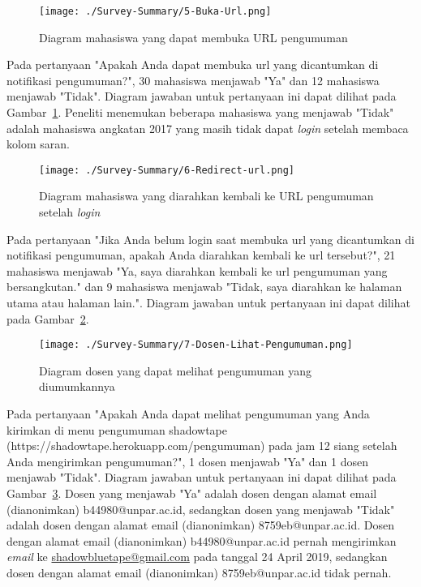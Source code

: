 \begin{figure}[H]
	\centering  
	\texttt{[image: ./Survey-Summary/5-Buka-Url.png]}
	\caption[Diagram mahasiswa yang dapat membuka URL pengumuman]{Diagram mahasiswa yang dapat membuka URL pengumuman} 
	\label{fig:summary-5-Buka-Url} 
\end{figure}
Pada pertanyaan "Apakah Anda dapat membuka url yang dicantumkan di notifikasi pengumuman?", 30 mahasiswa menjawab "Ya" dan 12 mahasiswa menjawab "Tidak". Diagram jawaban untuk pertanyaan ini dapat dilihat pada Gambar~\ref{fig:summary-5-Buka-Url}. Peneliti menemukan beberapa mahasiswa yang menjawab "Tidak" adalah mahasiswa angkatan 2017 yang masih tidak dapat \textit{login} setelah membaca kolom saran.

\begin{figure}[H]
	\centering  
	\texttt{[image: ./Survey-Summary/6-Redirect-url.png]}
	\caption[Diagram mahasiswa yang diarahkan kembali ke URL pengumuman setelah \textit{login}]{Diagram mahasiswa yang diarahkan kembali ke URL pengumuman setelah \textit{login}} 
	\label{fig:summary-6-Redirect-url} 
\end{figure}

Pada pertanyaan "Jika Anda belum login saat membuka url yang dicantumkan di notifikasi pengumuman, apakah Anda diarahkan kembali ke url tersebut?", 21 mahasiswa menjawab "Ya, saya diarahkan kembali ke url pengumuman yang bersangkutan." dan 9 mahasiswa menjawab "Tidak,  saya diarahkan ke halaman utama atau halaman lain.". Diagram jawaban untuk pertanyaan ini dapat dilihat pada Gambar~\ref{fig:summary-6-Redirect-url}.

\begin{figure}[H]
	\centering  
	\texttt{[image: ./Survey-Summary/7-Dosen-Lihat-Pengumuman.png]}
	\caption[Diagram dosen yang dapat melihat pengumuman yang diumumkannya]{Diagram dosen yang dapat melihat pengumuman yang diumumkannya} 
	\label{fig:summary-7-Dosen-Lihat-Pengumuman} 
\end{figure}

Pada pertanyaan "Apakah Anda dapat melihat pengumuman yang Anda kirimkan di menu pengumuman shadowtape (https://shadowtape.herokuapp.com/pengumuman) pada jam 12 siang setelah Anda mengirimkan pengumuman?", 1 dosen menjawab "Ya" dan 1 dosen menjawab "Tidak". Diagram jawaban untuk pertanyaan ini dapat dilihat pada Gambar~\ref{fig:summary-7-Dosen-Lihat-Pengumuman}. Dosen yang menjawab "Ya" adalah dosen dengan alamat email (dianonimkan) b44980@unpar.ac.id, sedangkan dosen yang menjawab "Tidak" adalah dosen dengan alamat email (dianonimkan) 8759eb@unpar.ac.id. Dosen dengan alamat email (dianonimkan) b44980@unpar.ac.id pernah mengirimkan \textit{email} ke \href{mailto:shadowbluetape@gmail.com}{shadowbluetape@gmail.com} pada tanggal 24 April 2019, sedangkan dosen dengan alamat email (dianonimkan) 8759eb@unpar.ac.id tidak pernah.

